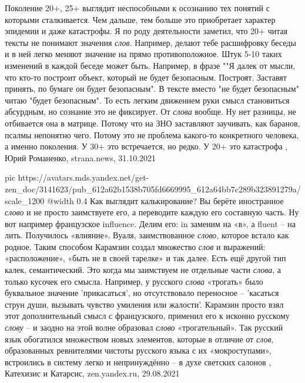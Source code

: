 Поколение 20+, 25+ выглядит неспособными к осознанию тех понятий с которыми
сталкивается. Чем дальше, тем больше это приобретает характер эпидемии и даже
катастрофы. Я по роду деятельности заметил, что 20+ читая тексты не понимают
значения \emph{слов}. Например, делают тебе расшифровку беседы и в ней легко меняют
значение на прямо противоположное. Штук 5-10 таких изменений в каждой беседе
может быть. Например, в фразе ""Я далек от мысли, что кто-то построит объект,
который не будет безопасным. Построят. Заставят принять, по бумаге он будет
безопасным". В тексте вместо "не будет безопасным" читаю "будет безопасным". То
есть легким движением руки смысл становиться абсурдным, но сознание это не
фиксирует. От \emph{слова} вообще. Ну нет разницы, не отбивается она в матрице. Потому
что на ЗНО заставляют заучивать, как баранов, псалмы непонятно чего. Потому это
не проблема какого-то конкретного человека, а именно поколения. У 30+ это
встречается, но редко. У 20+ это катастрофа
, 
Юрий Романенко, strana.news, 31.10.2021

\ifcmt
  pic https://avatars.mds.yandex.net/get-zen_doc/3141623/pub_612a62b1538b705fd6669995_612a64bb7c289b323891279a/scale_1200
  @width 0.4
\fi
Как выглядит калькирование? Вы берёте иностранное \emph{слово} и не просто
заимствуете его, а переводите каждую его составную часть. Ну вот например
французское influence. Делим его: in заменим на «в», а fluent – на лить.
Получилось «влияние». Вуаля, заимствованное \emph{слово}, которое встало как
родное. Таким способом Карамзин создал множество \emph{слов} и выражений:
«расположение», «быть не в своей тарелке» и так далее.  Есть ещё другой тип
калек, семантический. Это когда мы заимствуем не отдельные части \emph{слова},
а только кусочек его смысла. Например, у русского \emph{слова} «трогать» было
буквальное значение 'прикасаться', но отсутствовало переносное – 'касаться
струн души, вызывать чувство умиления или жалости'.  Карамзин просто взял этот
дополнительный смысл с французского, применил его к исконно русскому
\emph{слову} – и заодно на этой волне образовал \emph{слово} «трогательный».
Так русский язык обогатился множеством новых элементов, которые в отличие от
\emph{слов}, образованных ревнителями чистоты русского языка с их
«мокроступами», встроились в систему легко и непринуждённо – в духе светских
салонов
, Катехизис и Катарсис,
zen.yandex.ru, 29.08.2021  


